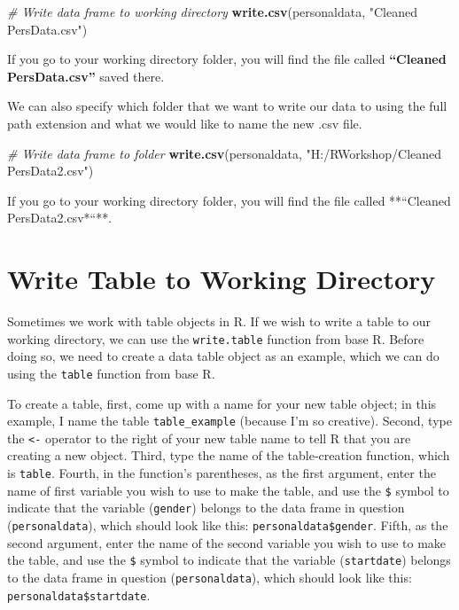 \documentclass[]{book}
\newenvironment{Shaded}{\begin{snugshade}}{\end{snugshade}}
\newcommand{\KeywordTok}[1]{\textcolor[rgb]{0.13,0.29,0.53}{\textbf{#1}}}
\newcommand{\StringTok}[1]{\textcolor[rgb]{0.31,0.60,0.02}{#1}}
\newcommand{\CommentTok}[1]{\textcolor[rgb]{0.56,0.35,0.01}{\textit{#1}}}
\newcommand{\NormalTok}[1]{#1}
\begin{document}
\begin{Shaded}
\begin{Highlighting}[]
\CommentTok{# Write data frame to working directory}
\KeywordTok{write.csv}\NormalTok{(personaldata, }\StringTok{"Cleaned PersData.csv"}\NormalTok{)}
\end{Highlighting}
\end{Shaded}

If you go to your working directory folder, you will find the file
called \textbf{``Cleaned PersData.csv''} saved there.

We can also specify which folder that we want to write our data to using
the full path extension and what we would like to name the new .csv
file.

\begin{Shaded}
\begin{Highlighting}[]
\CommentTok{# Write data frame to folder}
\KeywordTok{write.csv}\NormalTok{(personaldata, }\StringTok{"H:/RWorkshop/Cleaned PersData2.csv"}\NormalTok{)}
\end{Highlighting}
\end{Shaded}

If you go to your working directory folder, you will find the file
called **``Cleaned PersData2.csv*``**.

\section{Write Table to Working
Directory}\label{write-table-to-working-directory}

Sometimes we work with table objects in R. If we wish to write a table
to our working directory, we can use the \texttt{write.table} function
from base R. Before doing so, we need to create a data table object as
an example, which we can do using the \texttt{table} function from base
R.

To create a table, first, come up with a name for your new table object;
in this example, I name the table \texttt{table\_example} (because I'm
so creative). Second, type the \texttt{\textless{}-} operator to the
right of your new table name to tell R that you are creating a new
object. Third, type the name of the table-creation function, which is
\texttt{table}. Fourth, in the function's parentheses, as the first
argument, enter the name of first variable you wish to use to make the
table, and use the \texttt{\$} symbol to indicate that the variable
(\texttt{gender}) belongs to the data frame in question
(\texttt{personaldata}), which should look like this:
\texttt{personaldata\$gender}. Fifth, as the second argument, enter the
name of the second variable you wish to use to make the table, and use
the \texttt{\$} symbol to indicate that the variable
(\texttt{startdate}) belongs to the data frame in question
(\texttt{personaldata}), which should look like this:
\texttt{personaldata\$startdate}.
\end{document}
